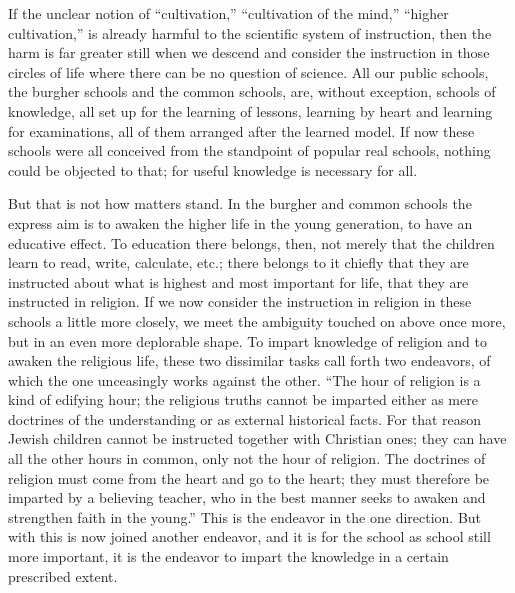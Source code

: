 \documentclass[12pt,a4paper,openany]{book}
\newcommand{\opage}[1]{\marginnote{\footnotesize\textit{[#1]}}}
\begin{document}
If the unclear notion of ``cultivation,'' ``cultivation of the mind,''
``higher cultivation,'' is already harmful to the
scientific system of instruction, then the harm is far
greater still when we descend and consider the instruction
in those circles of life where there can be
no question of science. All our public schools, the burgher schools
and the common schools, are, without exception,
schools of knowledge, all set up for the learning of lessons, learning by heart
and learning for examinations, all of them arranged
after the learned model. If now these schools were all
conceived from the standpoint of popular real schools,
nothing could be objected to that;
for useful knowledge is necessary for all.

But that is not how matters stand. In the burgher and
\setcounter{footnote}{0}%
\opage{311}common schools the express aim is to awaken
the higher life in the young generation, to have an educative effect.
To education there belongs, then, not merely that the children learn to
read, write, calculate, etc.; there belongs to it chiefly that
they are instructed about what is highest and most important for life, that
they are instructed in religion. If we now consider the instruction in religion
in these schools a little more closely, we meet
the ambiguity touched on above once more, but in an
even more deplorable shape. To impart knowledge of religion
and to awaken the religious life, these two dissimilar
tasks call forth two endeavors, of which the
one unceasingly works against the other. ``The hour of religion
is a kind of edifying hour; the religious truths
cannot be imparted either as mere doctrines of the understanding
or as external historical facts. For that reason
Jewish children cannot be instructed together with Christian ones;
they can have all the other hours in common, only not the hour
of religion. The doctrines of religion must come
from the heart and go to the heart; they must therefore be imparted
by a believing teacher, who in the best manner seeks
to awaken and strengthen faith in the young.'' This is the endeavor
in the one direction. But with this is now joined
another endeavor, and it is for the school as
school still more important, it is the endeavor to impart
the knowledge in a certain prescribed extent.
\end{document}
